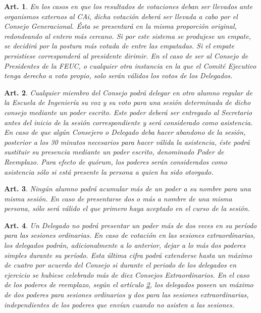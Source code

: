\documentclass[letterpaper,11pt]{article}
\theoremstyle{plain}
\newtheorem{art}{Art.} %
\begin{document}
			\begin{art}\label{votacionExterna}
				En los casos en que los resultados de votaciones deban ser llevados ante organismos externos al CAi, dicha votación deberá ser llevada a cabo por el Consejo Generacional. Ésta se presentará en la misma proporción original, redondeando al entero más cercano. Si por este sistema se produjese un empate, se decidirá por la postura más votada de entre las empatadas. Si el empate persistiese corresponderá al presidente dirimir. En el caso de ser al Consejo de Presidentes de la FEUC, o cualquier otra instancia en la que el Comité Ejecutivo tenga derecho a voto propio, solo serán válidos los votos de los Delegados.
			\end{art}

			\begin{art}\label{definicionPoder}
				Cualquier miembro del Consejo podrá delegar en otro alumno regular de la Escuela de Ingeniería su voz y su voto para una sesión determinada de dicho consejo mediante un poder escrito. Este poder deberá ser entregado al Secretario antes del inicio de la sesión correspondiente y será considerado como asistencia. En caso de que algún Consejero o Delegado deba hacer abandono de la sesión, posterior a los 30 minutos necesarios para hacer válida la asistencia, éste podrá sustituir su presencia mediante un poder escrito, denominado Poder de Reemplazo. Para efecto de quórum, los poderes serán considerados como asistencia sólo si está presente la persona a quien ha sido otorgado.
			\end{art}

			\begin{art}\label{maxPoderesRecividos}
				Ningún alumno podrá acumular más de un poder a su nombre para una misma sesión. En caso de presentarse dos o más a nombre de una misma persona, sólo será válido el que primero haya aceptado en el curso de la sesión.
			\end{art}

			\begin{art}\label{maxPoderesEmitidos}
				Un Delegado no podrá presentar un poder más de dos veces en su período para las sesiones ordinarias. En caso de votación en las sesiones extraordinarias, los delegados podrán, adicionalmente a lo anterior, dejar a lo más dos poderes simples durante su período. Esta última cifra podrá extenderse hasta un máximo de cuatro por acuerdo del Consejo si durante el periodo de los delegados en ejercicio se hubiese celebrado más de diez Consejos Extraordinarios. En el caso de los poderes de reemplazo, según el artículo \ref{definicionPoder}, los delegados poseen un máximo de dos poderes para sesiones ordinarios y dos para las sesiones extraordinarias, independientes de los poderes que envían cuando no asisten a las sesiones.
			\end{art}
\end{document}
